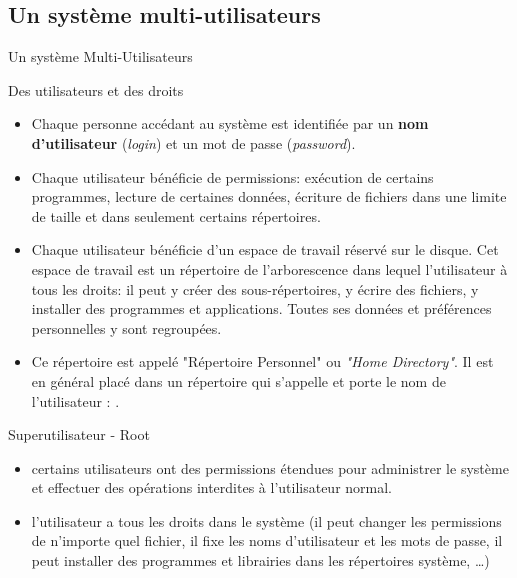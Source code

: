 \subsection{Un système multi-utilisateurs}
\begin{frame}{Un système Multi-Utilisateurs}
  \begin{block}{Des utilisateurs et des droits}
    \begin{itemize}
    \item Chaque personne accédant au système est identifiée par un \textbf{nom d'utilisateur} (\ie \textit{login}) et un mot de passe (\ie \textit{password}).
    \item Chaque utilisateur bénéficie de permissions: exécution de certains programmes, lecture de certaines données, écriture de fichiers dans une limite de taille et dans seulement certains répertoires.
    \item Chaque utilisateur bénéficie d'un espace de travail réservé sur le disque. Cet espace de travail est un répertoire de l'arborescence dans lequel l'utilisateur à tous les droits: il peut y créer des sous-répertoires, y écrire des fichiers, y installer des programmes et applications. Toutes ses données et préférences personnelles y sont regroupées.
    \item Ce répertoire est appelé "Répertoire Personnel" ou \textit{"Home Directory"}. Il est en général placé dans un répertoire qui s'appelle  et porte le nom de l'utilisateur : .
    \end{itemize}
  \end{block}
  \begin{alertblock}{Superutilisateur - Root}
    \begin{itemize}
    \item certains utilisateurs ont des permissions étendues pour administrer le système et effectuer des opérations interdites à l'utilisateur normal.
    \item l'utilisateur  a tous les droits dans le système (\ex il peut changer les permissions de n'importe quel fichier, il fixe les noms d'utilisateur et les mots de passe, il peut installer des programmes et librairies dans les répertoires système, \dots) 
    \end{itemize}
  \end{alertblock}
\end{frame}
